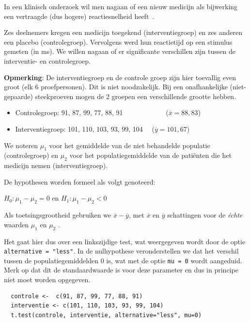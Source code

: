 \begin{example}
  In een klinisch onderzoek wil men nagaan of een nieuw medicijn als bijwerking een vertraagde (dus hogere) reactiesnelheid heeft~\autocite{Lindquist}.
  
  Zes deelnemers kregen een medicijn toegekend (interventiegroep) en zes anderen een placebo (controlegroep). Vervolgens werd hun reactietijd op een stimulus gemeten (in ms). We willen nagaan of er significante verschillen zijn tussen de interventie- en controlegroep.
  
  \textbf{Opmerking}: De interventiegroep en de controle groep zijn hier toevallig even groot (elk 6 proefpersonen).
  Dit is niet noodzakelijk. Bij een onafhankelijke (niet-gepaarde) steekproeven
  mogen de 2 groepen een verschillende grootte hebben.
  
  \begin{itemize}
    \item Controlegroep: 91, 87, 99, 77, 88, 91 ~~~~~~~~~~~~($\overline{x}=88,83$)
    \item Interventiegroep: 101, 110, 103, 93, 99, 104 ~~($\overline{y}=101,67$)
  \end{itemize}
  
  We noteren $\mu_1$ voor het gemiddelde van de niet behandelde populatie (controlegroep) en $\mu_2$ voor het populatiegemiddelde van de patiënten die het medicijn nemen (interventiegroep).
  
  De hypothesen worden formeel als volgt genoteerd:
  
  $H_0: \mu_1 - \mu_2 = 0$ en $H_1: \mu_1 - \mu_2 < 0$
  
  Als toetsingsgrootheid gebruiken we $\overline{x}-\overline{y}$, met $\overline{x}$ en $\overline{y}$ schattingen voor de \textit{\'echte} waarden $\mu_1$ en $\mu_2$ .
  
  Het gaat hier dus over een linkszijdige test, wat weergegeven wordt door de optie \texttt{alternative = "less"}. In de nulhypothese veronderstellen we dat het verschil tussen de populatiegemiddelden 0 is, wat met de optie \texttt{mu = 0} wordt aangeduid. Merk op dat dit de standaardwaarde is voor deze parameter en dus in principe niet moet worden opgegeven.
  
  \begin{lstlisting}
  controle <-  c(91, 87, 99, 77, 88, 91)
  interventie <- c(101, 110, 103, 93, 99, 104)
  t.test(controle, interventie, alternative="less", mu=0)
  \end{lstlisting}
  

\end{example}
